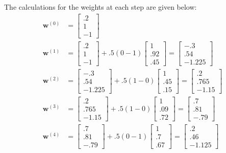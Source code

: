 \documentclass{article}
\begin{document}
The calculations for the weights at each step are given below:
\begin{align*}
 \mathbf w^{(0)}&=\begin{bmatrix}.2\\1\\-1\end{bmatrix}\\
 \mathbf w^{(1)}&=\begin{bmatrix}.2\\1\\-1\end{bmatrix}+.5(0-1)\begin{bmatrix}1\\.92\\.45\end{bmatrix}=\begin{bmatrix}-.3\\.54\\-1.225\end{bmatrix}\\
 \mathbf w^{(2)}&=\begin{bmatrix}-.3\\.54\\-1.225\end{bmatrix}+.5(1-0)\begin{bmatrix}1\\.45\\.15\end{bmatrix}=\begin{bmatrix}.2\\.765\\-1.15\end{bmatrix}\\
 \mathbf w^{(3)}&=\begin{bmatrix}.2\\.765\\-1.15\end{bmatrix}+.5(1-0)\begin{bmatrix}1\\.09\\.72\end{bmatrix}=\begin{bmatrix}.7\\.81\\-.79\end{bmatrix}\\
 \mathbf w^{(4)}&=\begin{bmatrix}.7\\.81\\-.79\end{bmatrix}+.5(0-1)\begin{bmatrix}1\\.7\\.67\end{bmatrix}=\begin{bmatrix}.2\\.46\\-1.125\end{bmatrix}\\

\end{align*}
\end{document}
